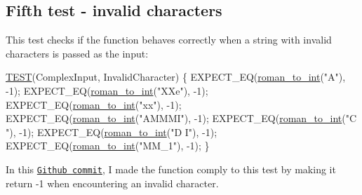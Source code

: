 \subsection*{Fifth test -\/ invalid characters }

This test checks if the function behaves correctly when a string with invalid characters is passed as the input\+:


\begin{DoxyCodeInclude}
\hyperlink{test_simple_8c_aff9fa977573ddab7597e233f1775d7c5}{TEST}(ComplexInput, InvalidCharacter) \{
    EXPECT\_EQ(\hyperlink{roman_8c_a5d15ad3ed29e4dc0fed9b718523c48c8}{roman\_to\_int}(\textcolor{stringliteral}{"A"}), -1);
    EXPECT\_EQ(\hyperlink{roman_8c_a5d15ad3ed29e4dc0fed9b718523c48c8}{roman\_to\_int}(\textcolor{stringliteral}{"XXe"}), -1);
    EXPECT\_EQ(\hyperlink{roman_8c_a5d15ad3ed29e4dc0fed9b718523c48c8}{roman\_to\_int}(\textcolor{stringliteral}{"xx"}), -1);
    EXPECT\_EQ(\hyperlink{roman_8c_a5d15ad3ed29e4dc0fed9b718523c48c8}{roman\_to\_int}(\textcolor{stringliteral}{"AMMMI"}), -1);
    EXPECT\_EQ(\hyperlink{roman_8c_a5d15ad3ed29e4dc0fed9b718523c48c8}{roman\_to\_int}(\textcolor{stringliteral}{"C "}), -1);
    EXPECT\_EQ(\hyperlink{roman_8c_a5d15ad3ed29e4dc0fed9b718523c48c8}{roman\_to\_int}(\textcolor{stringliteral}{"D  I"}), -1);
    EXPECT\_EQ(\hyperlink{roman_8c_a5d15ad3ed29e4dc0fed9b718523c48c8}{roman\_to\_int}(\textcolor{stringliteral}{"MM\_1"}), -1);
\}
\end{DoxyCodeInclude}
 In this \href{https://github.com/diogenes1oliveira/libroman/commit/818abdde2a85e1c1924458c4f25cfff65835bc95#diff-3d6fc1bf772186c45fcd2c22d7ecd7b4}{\tt Github commit}, I made the function comply to this test by making it return {\ttfamily -\/1} when encountering an invalid character. 